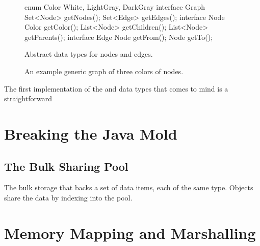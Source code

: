 \begin{figure}
\centering
{}
\begin{subfloat}
\begin{minipage}[b]{0.65\textwidth}
\begin{shortlisting}
enum Color {
	White, LightGray, DarkGray
}
interface Graph {
	Set<Node> getNodes();
	Set<Edge> getEdges();
}
interface Node {
	Color getColor();
	List<Node> getChildren();
	List<Node> getParents();
}
interface Edge {
	Node getFrom();
	Node getTo();
}
\end{shortlisting}
\end{minipage}
\caption{Abstract data types for nodes and edges.}
\end{subfloat}
	\caption{An example generic graph of three colors of nodes.}
	\label{fig:exampleGraph}
\end{figure}

The first implementation of the  and  data types that
comes to mind is a straightforward


\section{Breaking the Java Mold}
\label{sec:fortran-style}

\subsection{The Bulk Sharing Pool}
\label{sec:bulk-sharing-pool}

The bulk storage that backs a set of data items, each of the same type. Objects
share the data by indexing into the pool.

\section{Memory Mapping and Marshalling}